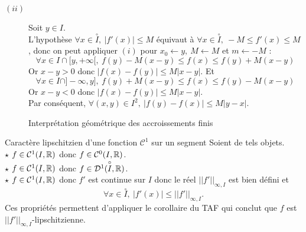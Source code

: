 \documentclass{article}
\renewenvironment{question_kholle}[2][ ]
{
	\subsection{\texorpdfstring{#2}{}}
	\notblank{#1}
	{
		\noindent #1
		\bigbreak
	}
	{}
	\begin{proof}
}
{
	\end{proof}
}
\begin{document}
\begin{question_kholle}
\begin{description}
		\item[$(ii)$] Soit $y \in I.$\\
		      L'hypothèse $\forall x\in \overset{\circ}{I}, \ |f'(x)|\leq M$ équivaut à $\forall x \in \overset{\circ}{I}, \ -M \leq f'(x) \leq M$, donc on peut appliquer $(i)$ pour $x_0 \gets y, \ M \gets M$ et $m\gets -M$ : $$\forall x \in I\cap [y, +\infty [,  \ f(y) -M(x-y) \leq f(x) \leq f(y) + M(x-y)$$
						      Or $x-y >0$ donc $|f(x) -f(y) | \leq M|x-y|$.
						      Et $$\forall x \in I\cap ]-\infty, y ],  \ f(y) +M(x-y) \leq f(x) \leq f(y) - M(x-y)$$
		      Or $x-y < 0$ donc $|f(x) -f(y) | \leq M|x-y|$. \\
		      Par conséquent, $\forall (x,y)\in I^2, \ |f(y) -f(x)| \leq M|y-x|.$
	\end{description}

	{\begin{figure}[!h]
		\centering
		\caption{Interprétation géométrique des accroissements finis}
	\end{figure}}
\end{question_kholle}


\begin{question_kholle}
	{Caractère lipschitzien d'une fonction $\mathcal{C}^1$ sur un segment}
	Soient de tels objets. \\
	$\star$ $f\in \mathcal{C}^1(I, \mathbb R)$ donc $f\in \mathcal{C}^0(I, \mathbb R)$. \\
	$\star$ $f\in \mathcal{C}^1(I,\mathbb R)$ donc $f\in \mathcal{D}^1(\overset{\circ}{I}, \mathbb R)$.\\
	$\star$ $f\in \mathcal{C}^1(I,\mathbb R)$ donc $f'$ est continue sur $I$ donc le réel $||f'||_{\infty,I}$ est bien défini et $$\forall  x \in \overset{\circ}{I}, \ |f'(x)| \leq ||f'||_{\infty,I}.$$ Ces propriétés permettent d'appliquer le corollaire du TAF qui conclut que $f$ est $||f'||_{\infty,I}$-lipschitzienne.
\end{question_kholle}
\end{document}
